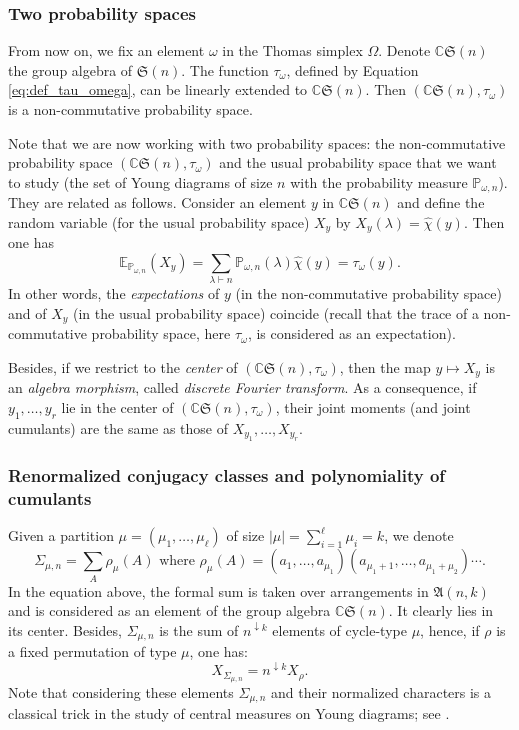 \documentclass[12pt,a4paper,reqno]{amsart}
\theoremstyle{remark}
\newcommand{\C}{\mathbb{C}}
\newcommand{\esper}{\mathbb{E}}
\newcommand{\proba}{\mathbb{P}}
\newcommand{\fall}[1]{^{\downarrow #1}}
\newcommand{\arr}{\mathfrak{A}}
\newcommand{\sym}{\mathfrak{S}}
\begin{document}
\subsubsection{Two probability spaces}
From now on, we fix an element $\omega$ in the Thomas simplex $\Omega$. Denote $\C\sym(n)$  the group algebra of $\sym(n)$. The function $\tau_\omega$, defined by Equation \eqref{eq:def_tau_omega}, can be linearly extended to $\C\sym(n)$. Then $(\C\sym(n),\tau_{\omega})$ is a non-commutative probability space.
\bigskip

Note that we are now working with two probability spaces: the non-commutative probability space $(\C\sym(n),\tau_{\omega})$ and the usual probability space that we want to study (the set of Young diagrams of size $n$ with the probability measure $\proba_{\omega,n}$). They are related as follows. Consider an element $y$ in $\C\sym(n)$ and define the random variable (for the usual probability space) $X_y$ by $X_y(\lambda)=\widehat{\chi}(y)$.
Then one has
\[\esper_{\proba_{\omega,n}}(X_y) = \sum_{\lambda \vdash n} \proba_{\omega,n}(\lambda)
\widehat{\chi}(y) = \tau_\omega(y).\]
In other words, the {\em expectations} of $y$ (in the non-commutative probability space) and of $X_y$ (in the usual probability space) coincide (recall that the trace of a non-commutative probability space, here $\tau_\omega$, is considered as an expectation).
\bigskip

Besides, if we restrict to the {\em center} of $(\C\sym(n),\tau_{\omega})$, then the map $y \mapsto X_y$ is an {\em algebra morphism}, called {\em discrete Fourier transform}. As a consequence, if $y_1,\dots,y_r$ lie in the center of $(\C\sym(n),\tau_{\omega})$, their joint moments (and joint cumulants) are the same as those of $X_{y_1},\dots,X_{y_r}$.


\subsubsection{Renormalized conjugacy classes and polynomiality of cumulants}
Given a partition $\mu=(\mu_{1},\ldots,\mu_{\ell})$ of size $|\mu|=\sum_{i=1}^{\ell}\mu_{i}=k$, we denote 
$$\varSigma_{\mu,n}=\sum_{A} \rho_\mu(A) \text{ where } \rho_\mu(A)=(a_1,\ldots,a_{\mu_{1}})(a_{\mu_1+1},\ldots,a_{\mu_1+\mu_{2}})\cdots.$$
In the equation above, the formal sum is taken over arrangements in $\arr(n,k)$ and is considered as an element of the group algebra $\C\sym(n)$. It clearly lies in its center. Besides, $\varSigma_{\mu,n}$ is the sum of $n\fall{k}$ elements of cycle-type $\mu$, hence, if $\rho$ is a fixed permutation of type $\mu$, one has:
\[X_{\varSigma_{\mu,n}} = n\fall{k} X_\rho.\]
Note that considering these elements $\varSigma_{\mu,n}$ and their normalized characters is a classical trick in the study of central measures on Young diagrams; see \cite{IO02,Sni06b,FM12}.
\bigskip
\end{document}
